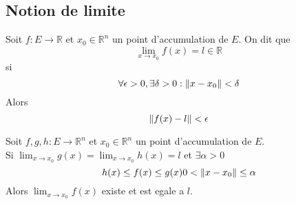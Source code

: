 \documentclass[../main.tex]{subfiles}
\begin{document}
\subsection{Notion de limite}
\begin{defn}[Limite]
	Soit $f: E \to \mathbb{R}$ et $x_0 \in \mathbb{R}^n$ un point d'accumulation de $E$. On dit que 
	 \[ 
		 \lim_{x \to x_0} f( x) = l \in \mathbb{R}
	\]
	si
	\[ 
		\forall \epsilon>0, \exists \delta>0: \left\lVert x-x_0\right\rVert < \delta
	\]
	Alors
\[ 
	\left\lVert f( x) -l\right\rVert < \epsilon
\]
\end{defn}
\begin{thm}
	Soit $f,g,h:E \to \mathbb{R}^n $ et $x_0 \in \mathbb{R}^{n}$ un point d'accumulation de $E$.\\
	Si $ \lim_{x \to x_0} g( x) = \lim_{x \to x_0} h( x) = l$ et $\exists \alpha>0$
	\[ 
		h( x) \leq f( x) \leq g( x)  0< \left\lVert x-x_0\right\rVert \leq \alpha
	\]
	Alors $ \lim_{x \to x_{0}  } f( x)$ existe et est egale a $l$.
	
\end{thm}


			
\end{document}
